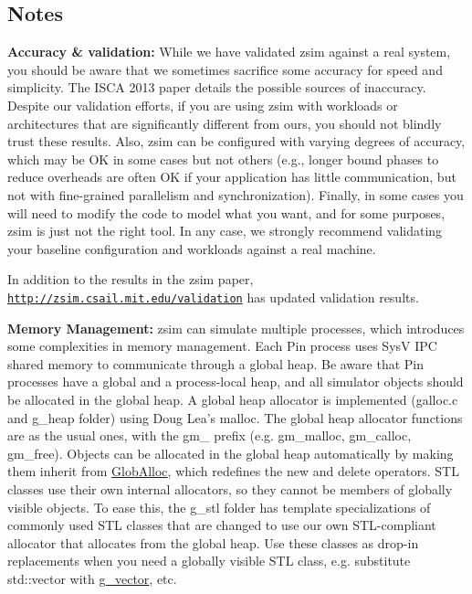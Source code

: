 \subsection*{Notes }

{\bfseries Accuracy \& validation\-:} While we have validated zsim against a real system, you should be aware that we sometimes sacrifice some accuracy for speed and simplicity. The I\-S\-C\-A 2013 paper details the possible sources of inaccuracy. Despite our validation efforts, if you are using zsim with workloads or architectures that are significantly different from ours, you should not blindly trust these results. Also, zsim can be configured with varying degrees of accuracy, which may be O\-K in some cases but not others (e.\-g., longer bound phases to reduce overheads are often O\-K if your application has little communication, but not with fine-\/grained parallelism and synchronization). Finally, in some cases you will need to modify the code to model what you want, and for some purposes, zsim is just not the right tool. In any case, we strongly recommend validating your baseline configuration and workloads against a real machine.

In addition to the results in the zsim paper, \href{http://zsim.csail.mit.edu/validation}{\tt http\-://zsim.\-csail.\-mit.\-edu/validation} has updated validation results.

{\bfseries Memory Management\-:} zsim can simulate multiple processes, which introduces some complexities in memory management. Each Pin process uses Sys\-V I\-P\-C shared memory to communicate through a global heap. Be aware that Pin processes have a global and a process-\/local heap, and all simulator objects should be allocated in the global heap. A global heap allocator is implemented (galloc.\-c and g\-\_\-heap folder) using Doug Lea's malloc. The global heap allocator functions are as the usual ones, with the gm\-\_\- prefix (e.\-g. gm\-\_\-malloc, gm\-\_\-calloc, gm\-\_\-free). Objects can be allocated in the global heap automatically by making them inherit from \hyperlink{classGlobAlloc}{Glob\-Alloc}, which redefines the new and delete operators. S\-T\-L classes use their own internal allocators, so they cannot be members of globally visible objects. To ease this, the g\-\_\-stl folder has template specializations of commonly used S\-T\-L classes that are changed to use our own S\-T\-L-\/compliant allocator that allocates from the global heap. Use these classes as drop-\/in replacements when you need a globally visible S\-T\-L class, e.\-g. substitute std\-::vector with \hyperlink{classg__vector}{g\-\_\-vector}, etc.


